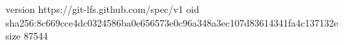 version https://git-lfs.github.com/spec/v1
oid sha256:8c669cce4dc0324586ba0e656573e0c96a348a3ec107d83614341fa4c137132e
size 87544
